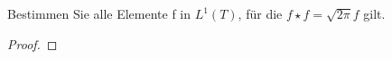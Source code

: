 
\begin{exercise}
	Bestimmen Sie alle Elemente f in $L^1(T)$, für die $f \star f = \sqrt{2\pi}f$ gilt.
\end{exercise}

\begin{proof}
	
\end{proof}
